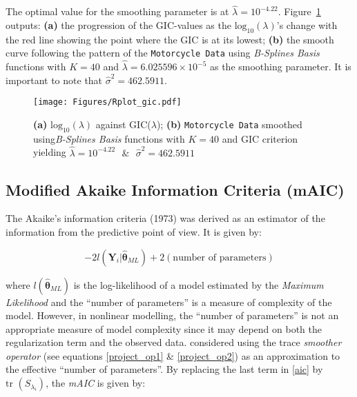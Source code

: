 The optimal value for the smoothing parameter is at $\hat{\lambda} = 10^{-4.22}$. Figure~\ref{fig:gic_plot} outputs: \textbf{(a)} the progression of the GIC-values as the $\text{log}_{10} (\lambda)$'s change with the red line showing the point where the GIC is at its lowest; \textbf{(b)} the smooth curve following the pattern of the \texttt{Motorcycle Data} using \textit{B-Splines Basis} functions with $K = 40$ and $\hat{\lambda} = 6.025596 \times 10^{-5}$ as the smoothing parameter. It is important to note that $\hat{\sigma}^2 = 462.5911$.

\begin{figure}[th]
    \texttt{[image: Figures/Rplot\_gic.pdf]}
  \caption[\textit{Penalized Maximum Likelihood} method evaluated using GIC]{\textbf{(a)} $\text{log}_{10} (\lambda)$ against GIC($\lambda$); \textbf{(b)} \texttt{Motorcycle Data} smoothed using\textit{B-Splines Basis} functions with $K = 40$ and GIC criterion yielding $\hat{\lambda} = 10^{-4.22}\text{ }\&\text{ }\hat{\sigma}^2 = 462.5911$ }
  \label{fig:gic_plot}
\end{figure}

\subsection{Modified Akaike Information Criteria (mAIC)}\label{mAIC}
The Akaike's information criteria (1973) was derived as an estimator of the \cite{kullback1951} information from the predictive point of view. It is given by:

\begin{equation}\label{aic}
-2 l(\bm{Y}_i|\bm{\hat{\theta}}_{ML}) + 2(\text{number of parameters})
\end{equation} 

where $l(\bm{\hat{\theta}}_{ML})$ is the log-likelihood of a model estimated by the \textit{Maximum Likelihood} and the ``number of parameters'' is a measure of complexity of the model. However, in nonlinear modelling, the ``number of parameters'' is not an appropriate measure of model complexity since it may depend on both the regularization term and the observed data. \cite{Fujikoshi1997} considered using the trace \textit{smoother operator} (see equations \eqref{project_op1} \& \eqref{project_op2}) as an approximation to the effective ``number of parameters''. By replacing the last term in \eqref{aic} by $\text{tr }(S_{\lambda_i})$, the \textit{mAIC} is given by:


